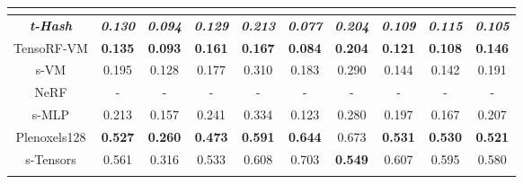 \documentclass[letterpaper]{article} \usepackage{aaai23}  \usepackage{times}  \usepackage{helvet}  \usepackage{courier}  \usepackage[hyphens]{url}  \usepackage{graphicx} \urlstyle{rm} \def\UrlFont{\rm}  \usepackage{natbib}  \usepackage{caption} \frenchspacing  \setlength{\pdfpagewidth}{8.5in}  \setlength{\pdfpageheight}{11in}  \usepackage{multirow}
\begin{document}
\begin{table*}[t]
{\begin{tabular}{c|ccccccccc}
                         & \multicolumn{9}{c}{}                                                                                                                                                                                                    \\ \hline
\textit{\textbf{t-Hash}} & \textit{\textbf{0.130}} & \textit{\textbf{0.094}} & \textit{\textbf{0.129}} & \textit{\textbf{0.213}} & \textit{\textbf{0.077}} & \textit{\textbf{0.204}} & \textit{\textbf{0.109}} & \textit{\textbf{0.115}} & \textit{\textbf{0.105}} \\
TensoRF-VM               & \textbf{0.135}          & \textbf{0.093}          & \textbf{0.161}          & \textbf{0.167}          & \textbf{0.084}          & \textbf{0.204}          & \textbf{0.121}          & \textbf{0.108}          & \textbf{0.146}          \\
s-VM                     & 0.195                   & 0.128                   & 0.177                   & 0.310                   & 0.183                   & 0.290                   & 0.144                   & 0.142                   & 0.191                   \\
NeRF                     & -                       & -                       & -                       & -                       & -                       & -                       & -                       & -                       & -                       \\
s-MLP                    & 0.213                   & 0.157                   & 0.241                   & 0.334                   & 0.123                   & 0.280                   & 0.197                   & 0.167                   & 0.207                   \\
Plenoxels128             & \textbf{0.527}          & \textbf{0.260}          & \textbf{0.473}          & \textbf{0.591}          & \textbf{0.644}          & 0.673                   & \textbf{0.531}          & \textbf{0.530}          & \textbf{0.521}          \\
s-Tensors                & 0.561                   & 0.316                   & 0.533                   & 0.608                   & 0.703                   & \textbf{0.549}          & 0.607                   & 0.595                   & 0.580                   \\ \hline
                         & \multicolumn{9}{c}{}                                                                                                                                                                                                     \\ \hline

\end{tabular}}
\end{table*}
\end{document}
